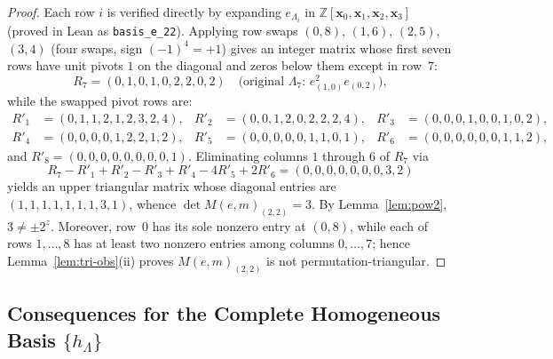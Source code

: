 \documentclass[11pt,a4paper]{article}
\theoremstyle{definition}
\theoremstyle{remark}
\newcommand{\ZZ}{\mathbb{Z}}
\newcommand{\vecx}{\mathbf{x}}
\begin{document}
\begin{proof}
Each row $i$ is verified directly by expanding $e_{\Lambda_i}$ in $\ZZ[\vecx_0,\vecx_1,\vecx_2,\vecx_3]$ (proved in Lean as \texttt{basis\_e\_22}). Applying row swaps $(0,8)$, $(1,6)$, $(2,5)$, $(3,4)$ (four swaps, sign $(-1)^4 = +1$) gives an integer matrix whose first seven rows have unit pivots $1$ on the diagonal and zeros below them except in row~$7$:
\[
  R_7 = (0, 1, 0, 1, 0, 2, 2, 0, 2) \quad\text{(original $\Lambda_7$: $e_{(1,0)}^2 e_{(0,2)}$)},
\]
while the swapped pivot rows are:
\begin{align*}
  R'_1 &= (0, 1, 1, 2, 1, 2, 3, 2, 4), &
  R'_2 &= (0, 0, 1, 2, 0, 2, 2, 2, 4), &
  R'_3 &= (0, 0, 0, 1, 0, 0, 1, 0, 2), \\
  R'_4 &= (0, 0, 0, 0, 1, 2, 2, 1, 2), &
  R'_5 &= (0, 0, 0, 0, 0, 1, 1, 0, 1), &
  R'_6 &= (0, 0, 0, 0, 0, 0, 1, 1, 2),
\end{align*}
and $R'_8 = (0,0,0,0,0,0,0,0,1)$. Eliminating columns $1$ through $6$ of $R_7$ via
\[
  R_7 - R'_1 + R'_2 - R'_3 + R'_4 - 4 R'_5 + 2 R'_6 = (0, 0, 0, 0, 0, 0, 0, 3, 2)
\]
yields an upper triangular matrix whose diagonal entries are $(1,1,1,1,1,1,1,3,1)$, whence $\det M(e,m)_{(2,2)} = 3$. By Lemma~\ref{lem:pow2}, $3 \neq \pm 2^z$. Moreover, row~$0$ has its sole nonzero entry at $(0,8)$, while each of rows $1, \dots, 8$ has at least two nonzero entries among columns $0, \dots, 7$; hence Lemma~\ref{lem:tri-obs}(ii) proves $M(e,m)_{(2,2)}$ is not permutation-triangular.
\end{proof}

\subsection{Consequences for the Complete Homogeneous Basis \texorpdfstring{$\{h_\Lambda\}$}{\{h\_Lambda\}}}
\end{document}
